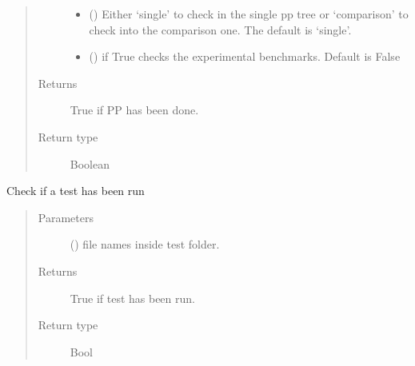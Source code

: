\documentclass[letterpaper,10pt,english]{sphinxmanual}
\begin{document}
\begin{fulllineitems}
\begin{fulllineitems}
\begin{quote}
\begin{description}
\begin{itemize}
\item {} 
\sphinxAtStartPar
{} (\sphinxstyleliteralemphasis{\sphinxupquote{, }}) \textendash{} Either ‘single’ to check in the single pp tree or ‘comparison’
to check into the comparison one. The default is ‘single’.

\item {} 
\sphinxAtStartPar
{} () \textendash{} if True checks the experimental benchmarks. Default is False

\end{itemize}

\item[{Returns}] \leavevmode
\sphinxAtStartPar
True if PP has been done.

\item[{Return type}] \leavevmode
\sphinxAtStartPar
Boolean

\end{description}\end{quote}

\end{fulllineitems}


\begin{fulllineitems}
\label{\detokenize{api/initobjects:status.Status.check_test_run}}
\sphinxAtStartPar
Check if a test has been run
\begin{quote}\begin{description}
\item[{Parameters}] \leavevmode
\sphinxAtStartPar
{} () \textendash{} file names inside test folder.

\item[{Returns}] \leavevmode
\sphinxAtStartPar
{} \textendash{} True if test has been run.

\item[{Return type}] \leavevmode
\sphinxAtStartPar
Bool


\end{description}
\end{quote}
\end{fulllineitems}
\end{fulllineitems}
\end{document}
